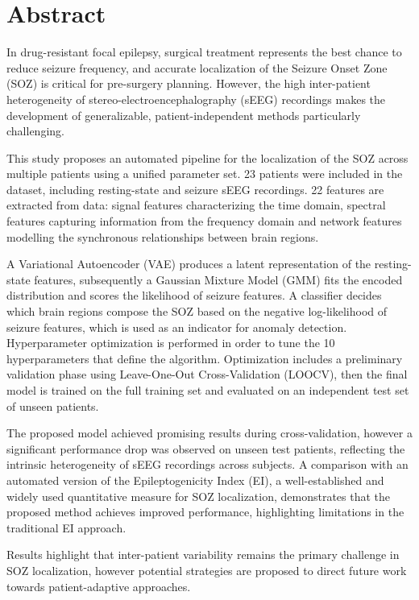 \pagebreak
    \hspace{0pt}
    \vfill
    \section*{Abstract}
    
    In drug-resistant focal epilepsy, surgical treatment represents the best
    chance to reduce seizure frequency, and accurate localization of the
    Seizure Onset Zone (SOZ) is critical for pre-surgery planning.
    However, the high inter-patient heterogeneity of stereo-electroencephalography
    (sEEG) recordings makes the development of generalizable, patient-independent
    methods particularly challenging.

    This study proposes an automated pipeline for the localization of the SOZ
    across multiple patients using a unified parameter set.
    23 patients were included in the dataset, including resting-state
    and seizure sEEG recordings.
    22 features are extracted from data:
    signal features characterizing the time domain, spectral features capturing
    information from the frequency domain and network features modelling the
    synchronous relationships between brain regions.

    A Variational Autoencoder (VAE) produces a latent representation of the
    resting-state features, subsequently a Gaussian Mixture Model (GMM)
    fits the encoded distribution and scores the likelihood of seizure features.
    A classifier decides which brain regions compose the SOZ based on the
    negative log-likelihood of seizure features, which is used as an indicator
    for anomaly detection.
    Hyperparameter optimization is performed in order to tune the 10
    hyperparameters that define the algorithm.
    Optimization includes a preliminary validation phase using Leave-One-Out
    Cross-Validation (LOOCV), then the final model is trained on the full
    training set and evaluated on an independent test set of unseen patients.

    The proposed model achieved promising results during cross-validation,
    however a significant performance drop was observed on unseen test patients,
    reflecting the intrinsic heterogeneity of sEEG recordings across subjects.
    A comparison with an automated version of the Epileptogenicity Index (EI),
    a well-established and widely used quantitative measure for SOZ localization,
    demonstrates that the proposed method achieves improved performance,
    highlighting limitations in the traditional EI approach.

    Results highlight that inter-patient variability remains the primary
    challenge in SOZ localization, however potential strategies are proposed
    to direct future work towards patient-adaptive approaches.
    \vfill
    \hspace{0pt}
\pagebreak

